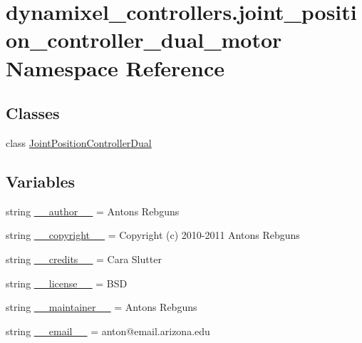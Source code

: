 \hypertarget{namespacedynamixel__controllers_1_1joint__position__controller__dual__motor}{}\section{dynamixel\+\_\+controllers.\+joint\+\_\+position\+\_\+controller\+\_\+dual\+\_\+motor Namespace Reference}
\label{namespacedynamixel__controllers_1_1joint__position__controller__dual__motor}
\subsection*{Classes}
\begin{DoxyCompactItemize}
\item 
class \hyperlink{classdynamixel__controllers_1_1joint__position__controller__dual__motor_1_1_joint_position_controller_dual}{Joint\+Position\+Controller\+Dual}
\end{DoxyCompactItemize}
\subsection*{Variables}
\begin{DoxyCompactItemize}
\item 
string \hyperlink{namespacedynamixel__controllers_1_1joint__position__controller__dual__motor_a7441f7d749537d56c118970d76ba8154}{\+\_\+\+\_\+author\+\_\+\+\_\+} = \textquotesingle{}Antons Rebguns\textquotesingle{}
\item 
string \hyperlink{namespacedynamixel__controllers_1_1joint__position__controller__dual__motor_af23956170f7eeb002492bb37d91164c8}{\+\_\+\+\_\+copyright\+\_\+\+\_\+} = \textquotesingle{}Copyright (c) 2010-\/2011 Antons Rebguns\textquotesingle{}
\item 
string \hyperlink{namespacedynamixel__controllers_1_1joint__position__controller__dual__motor_a6296ff912bd0f85f2d9a951144e6ec6b}{\+\_\+\+\_\+credits\+\_\+\+\_\+} = \textquotesingle{}Cara Slutter\textquotesingle{}
\item 
string \hyperlink{namespacedynamixel__controllers_1_1joint__position__controller__dual__motor_a63ce32cdb1c42aa9144a350700f15d9f}{\+\_\+\+\_\+license\+\_\+\+\_\+} = \textquotesingle{}B\+SD\textquotesingle{}
\item 
string \hyperlink{namespacedynamixel__controllers_1_1joint__position__controller__dual__motor_a8d58cc7d7f64c55c61f91dc93209031e}{\+\_\+\+\_\+maintainer\+\_\+\+\_\+} = \textquotesingle{}Antons Rebguns\textquotesingle{}
\item 
string \hyperlink{namespacedynamixel__controllers_1_1joint__position__controller__dual__motor_a73bf2c240fe4a2f9f79aee9859db39f1}{\+\_\+\+\_\+email\+\_\+\+\_\+} = \textquotesingle{}anton@email.\+arizona.\+edu\textquotesingle{}
\end{DoxyCompactItemize}


